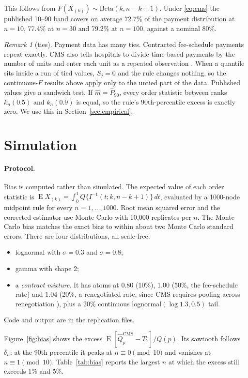 \documentclass[11pt]{article}
\theoremstyle{remark}
\newtheorem{remark}{Remark}
\DeclareMathOperator{\E}{E}
\begin{document}
This follows from $F(X_{(k)})\sim\mathrm{Beta}(k,n-k+1)$. Under \eqref{eq:cms} the published 10--90 band covers on average 72.7\% of the payment distribution at $n=10$, 77.4\% at $n=30$ and 79.2\% at $n=100$, against a nominal 80\%.

\begin{remark}[ties]
Payment data has many ties. Contracted fee-schedule payments repeat exactly. CMS also tells hospitals to divide time-based payments by the number of units and enter each unit as a repeated observation \citep[p.~13]{cmsfaq}. When a quantile sits inside a run of tied values, $S_j=0$ and the rule changes nothing, so the continuous-$F$ results above apply only to the untied part of the data. Published values give a sandwich test. If $\hat m=\hat P_{90}$, every order statistic between ranks $k_n(0.5)$ and $k_n(0.9)$ is equal, so the rule's 90th-percentile excess is exactly zero. We use this in Section~\ref{sec:empirical}.
\end{remark}

\section{Simulation}\label{sec:sim}

\paragraph{Protocol.} Bias is computed rather than simulated. The expected value of each order statistic is $\E X_{(k)}=\int_0^1 Q\{I^{-1}(t;k,n-k+1)\}\,dt$, evaluated by a 1000-node midpoint rule for every $n=1,\dots,1000$. Root mean squared error and the corrected estimator use Monte Carlo with 10{,}000 replicates per $n$. The Monte Carlo bias matches the exact bias to within about two Monte Carlo standard errors. There are four distributions, all scale-free:
\begin{itemize}
\item lognormal with $\sigma=0.3$ and $\sigma=0.8$;
\item gamma with shape 2;
\item a \emph{contract mixture}. It has atoms at 0.80 (10\%), 1.00 (50\%, the fee-schedule rate) and 1.04 (20\%, a renegotiated rate, since CMS requires pooling across renegotiation \citep{cmswebinar}), plus a 20\% continuous lognormal$(\log1.3,0.5)$ tail.
\end{itemize}
Code and output are in the replication files.

Figure~\ref{fig:bias} shows the excess $\E[\widehat Q^{\mathrm{CMS}}_p-T_7]/Q(p)$. Its sawtooth follows $\delta_n$: at the 90th percentile it peaks at $n\equiv 0\pmod{10}$ and vanishes at $n\equiv1\pmod{10}$. Table~\ref{tab:bias} reports the largest $n$ at which the excess still exceeds 1\% and 5\%.
\end{document}
